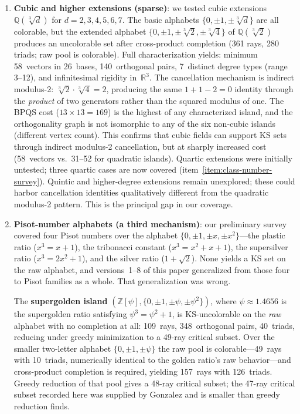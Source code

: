 \documentclass[12pt,a4paper]{article}
\newcommand{\R}{\mathbb{R}}
\newcommand{\Z}{\mathbb{Z}}
\newcommand{\Q}{\mathbb{Q}}
\begin{document}
\begin{enumerate}
    \item \textbf{Cubic and higher extensions (sparse)}: we tested cubic extensions $\Q(\sqrt[3]{d})$ for $d = 2, 3, 4, 5, 6, 7$. The basic alphabets $\{0,\pm 1,\pm\sqrt[3]{d}\}$ are all colorable, but the extended alphabet $\{0,\pm 1,\pm\sqrt[3]{2},\pm\sqrt[3]{4}\}$ of $\Q(\sqrt[3]{2})$ produces an uncolorable set after cross-product completion (361 rays, 280 triads; raw pool is colorable).  Full characterization yields: minimum 58~vectors in 26~bases, 140~orthogonal pairs, 7~distinct degree types (range 3--12), and infinitesimal rigidity in~$\R^3$.  The cancellation mechanism is indirect modulus-2: $\sqrt[3]{2} \cdot \sqrt[3]{4} = 2$, producing the same $1 + 1 - 2 = 0$ identity through the \emph{product} of two generators rather than the squared modulus of one.  The BPQS cost ($13 \times 13 = 169$) is the highest of any characterized island, and the orthogonality graph is not isomorphic to any of the six non-cubic islands (different vertex count).  This confirms that cubic fields can support KS sets through indirect modulus-2 cancellation, but at sharply increased cost (58~vectors vs.\ 31--52 for quadratic islands).  Quartic extensions were initially untested; three quartic cases are now covered (item~\ref{item:class-number-survey}).  Quintic and higher-degree extensions remain unexplored; these could harbor cancellation identities qualitatively different from the quadratic modulus-2 pattern.  This is the principal gap in our coverage.
    \item \label{item:pisot}\textbf{Pisot-number alphabets (a third mechanism)}: our preliminary survey covered four Pisot numbers over the alphabet $\{0, \pm 1, \pm x, \pm x^2\}$---the plastic ratio ($x^3 = x + 1$), the tribonacci constant ($x^3 = x^2 + x + 1$), the supersilver ratio ($x^3 = 2x^2 + 1$), and the silver ratio ($1 + \sqrt{2}$).  None yields a KS set on the raw alphabet, and versions~1--8 of this paper generalized from those four to Pisot families as a whole.  That generalization was wrong.

    The \textbf{supergolden island} $(\Z[\psi], \{0,\pm 1,\pm\psi,\pm\psi^2\})$, where $\psi \approx 1.4656$ is the supergolden ratio satisfying $\psi^3 = \psi^2 + 1$, is KS-uncolorable on the \emph{raw} alphabet with no completion at all: 109~rays, 348~orthogonal pairs, 40~triads, reducing under greedy minimization to a 49-ray critical subset.  Over the smaller two-letter alphabet $\{0,\pm 1,\pm\psi\}$ the raw pool is colorable---49~rays with 10~triads, numerically identical to the golden ratio's raw behavior---and cross-product completion is required, yielding 157~rays with 126~triads.  Greedy reduction of that pool gives a 48-ray critical subset; the 47-ray critical subset recorded here was supplied by Gonzalez and is smaller than greedy reduction finds.


\end{enumerate}
\end{document}
